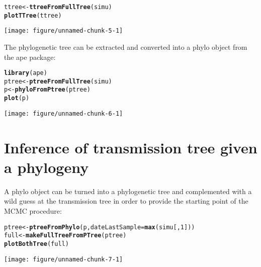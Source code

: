 \documentclass[a4paper]{article}\usepackage[]{graphicx}\usepackage[]{color}
\makeatletter
\newcommand{\hlnum}[1]{\textcolor[rgb]{0.686,0.059,0.569}{#1}}%
\newcommand{\hlstd}[1]{\textcolor[rgb]{0.345,0.345,0.345}{#1}}%
\newcommand{\hlkwb}[1]{\textcolor[rgb]{0.69,0.353,0.396}{#1}}%
\newcommand{\hlkwc}[1]{\textcolor[rgb]{0.333,0.667,0.333}{#1}}%
\newcommand{\hlkwd}[1]{\textcolor[rgb]{0.737,0.353,0.396}{\textbf{#1}}}%
\newenvironment{kframe}{%
 \def\at@end@of@kframe{}%
 \ifinner\ifhmode%
  \def\at@end@of@kframe{\end{minipage}}%
  \begin{minipage}{\columnwidth}%
 \fi\fi%
 \def\FrameCommand##1{\hskip\@totalleftmargin \hskip-\fboxsep
 \colorbox{shadecolor}{##1}\hskip-\fboxsep
     \hskip-\linewidth \hskip-\@totalleftmargin \hskip\columnwidth}%
 \MakeFramed {\advance\hsize-\width
   \@totalleftmargin\z@ \linewidth\hsize
   \@setminipage}}%
 {\par\unskip\endMakeFramed%
 \at@end@of@kframe}
\newenvironment{knitrout}{}{} %
\makeatother
\begin{document}
\begin{knitrout}
\color{fgcolor}\begin{kframe}
\begin{alltt}
\hlstd{ttree}\hlkwb{<-}\hlkwd{ttreeFromFullTree}\hlstd{(simu)}
\hlkwd{plotTTree}\hlstd{(ttree)}
\end{alltt}
\end{kframe}

{\centering \texttt{[image: figure/unnamed-chunk-5-1]} 

}



\end{knitrout}

The phylogenetic tree can be extracted and converted into a phylo object from the ape package:

\begin{knitrout}
\color{fgcolor}\begin{kframe}
\begin{alltt}
\hlkwd{library}\hlstd{(ape)}
\hlstd{ptree}\hlkwb{<-}\hlkwd{ptreeFromFullTree}\hlstd{(simu)}
\hlstd{p}\hlkwb{<-}\hlkwd{phyloFromPtree}\hlstd{(ptree)}
\hlkwd{plot}\hlstd{(p)}
\end{alltt}
\end{kframe}

{\centering \texttt{[image: figure/unnamed-chunk-6-1]} 

}



\end{knitrout}

\section{Inference of transmission tree given a phylogeny}

A phylo object can be turned  into a phylogenetic tree and complemented with a wild guess at the transmission tree in order to provide the starting point of the MCMC procedure:

\begin{knitrout}
\color{fgcolor}\begin{kframe}
\begin{alltt}
\hlstd{ptree}\hlkwb{<-}\hlkwd{ptreeFromPhylo}\hlstd{(p,}\hlkwc{dateLastSample}\hlstd{=}\hlkwd{max}\hlstd{(simu[,}\hlnum{1}\hlstd{]))}
\hlstd{full}\hlkwb{<-}\hlkwd{makeFullTreeFromPTree}\hlstd{(ptree)}
\hlkwd{plotBothTree}\hlstd{(full)}
\end{alltt}
\end{kframe}

{\centering \texttt{[image: figure/unnamed-chunk-7-1]} 

}



\end{knitrout}
\end{document}
